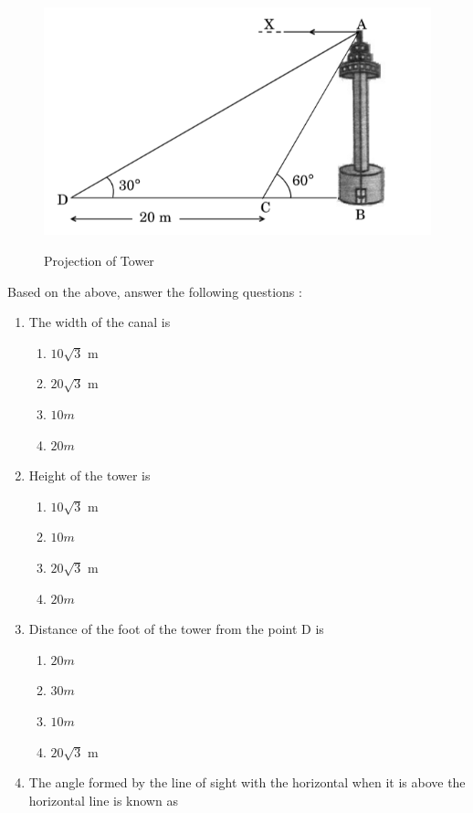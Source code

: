 \documentclass[11pt]{article}
\begin{document}
\begin{enumerate}
		\begin{figure}[ht!]
			\includegraphics[width=\columnwidth]{Figs/Problem.png}
			\label{fig:traingle}
			\caption{Projection of Tower}
		\end{figure}
		Based on the above, answer the following questions :
		\begin{enumerate}[label=(\roman*)]
			\item The width of the canal is
				\begin{enumerate}[label=(\Alph*)]
					\item ${10}\sqrt{3}$ m
					\item ${20}\sqrt{3}$ m
					\item $10 m$
					\item $20 m$
				\end{enumerate}
			\item Height of the tower is
				\begin{enumerate}[label=(\Alph*)]
					\item ${10}\sqrt{3}$ m
					\item $10 m$
					\item ${20}\sqrt{3}$ m
					\item $20 m$
				\end{enumerate}
			\item Distance of the foot of the tower from the point D is
				\begin{enumerate}[label=(\Alph*)]
					\item $20 m$
					\item $30 m$
					\item $10 m$
					\item ${20}\sqrt{3}$ m
				\end{enumerate}
			\item The angle formed by the line of sight with the horizontal when it is above the horizontal line is known as

\end{enumerate}
\end{enumerate}
\end{document}
